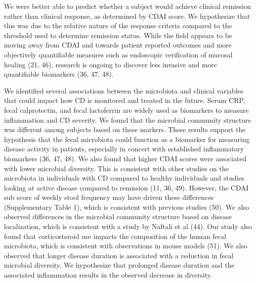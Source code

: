 \documentclass[12pt,]{article}
\begin{document}
We were better able to predict whether a subject would achieve clinical
remission rather than clinical response, as determined by CDAI score. We
hypothesize that this was due to the relative nature of the response
criteria compared to the threshold used to determine remission status.
While the field appears to be moving away from CDAI and towards patient
reported outcomes and more objectively quantifiable measures such as
endoscopic verification of mucosal healing (21, 46), research is ongoing
to discover less invasive and more quantifiable biomarkers (36, 47, 48).

We identified several associations between the microbiota and clinical
variables that could impact how CD is monitored and treated in the
future. Serum CRP, fecal calprotectin, and fecal lactoferrin are widely
used as biomarkers to measure inflammation and CD severity. We found
that the microbial community structure was different among subjects
based on these markers. These results support the hypothesis that the
fecal microbiota could function as a biomarker for measuring disease
activity in patients, especially in concert with established
inflammatory biomarkers (36, 47, 48). We also found that higher CDAI
scores were associated with lower microbial diversity. This is
consistent with other studies on the microbiota in individuals with CD
compared to healthy individuals and studies looking at active disease
compared to remission (11, 36, 49). However, the CDAI sub score of
weekly stool frequency may have driven these differences (Supplementary
Table 1), which is consistent with previous studies (50). We also
observed differences in the microbial community structure based on
disease localization, which is consistent with a study by Naftali et al
(44). Our study also found that corticosteroid use impacts the
composition of the human fecal microbiota, which is consistent with
observations in mouse models (51). We also observed that longer disease
duration is associated with a reduction in fecal microbial diversity. We
hypothesize that prolonged disease duration and the associated
inflammation results in the observed decrease in diversity.
\end{document}
